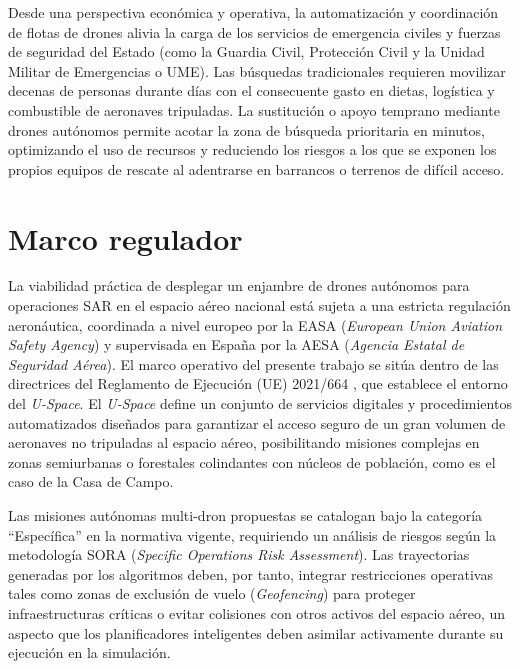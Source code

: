 Desde una perspectiva económica y operativa, la automatización y coordinación de flotas de drones alivia la carga de los servicios de emergencia civiles y fuerzas de seguridad del Estado (como la Guardia Civil, Protección Civil y la Unidad Militar de Emergencias o UME). Las búsquedas tradicionales requieren movilizar decenas de personas durante días con el consecuente gasto en dietas, logística y combustible de aeronaves tripuladas. La sustitución o apoyo temprano mediante drones autónomos permite acotar la zona de búsqueda prioritaria en minutos, optimizando el uso de recursos y reduciendo los riesgos a los que se exponen los propios equipos de rescate al adentrarse en barrancos o terrenos de difícil acceso.

\section{Marco regulador}
La viabilidad práctica de desplegar un enjambre de drones autónomos para operaciones SAR en el espacio aéreo nacional está sujeta a una estricta regulación aeronáutica, coordinada a nivel europeo por la EASA (\textit{European Union Aviation Safety Agency}) y supervisada en España por la AESA (\textit{Agencia Estatal de Seguridad Aérea}). El marco operativo del presente trabajo se sitúa dentro de las directrices del Reglamento de Ejecución (UE) 2021/664 \cite{eu2021uspace}, que establece el entorno del \textit{U-Space}. El \textit{U-Space} define un conjunto de servicios digitales y procedimientos automatizados diseñados para garantizar el acceso seguro de un gran volumen de aeronaves no tripuladas al espacio aéreo, posibilitando misiones complejas en zonas semiurbanas o forestales colindantes con núcleos de población, como es el caso de la Casa de Campo.

Las misiones autónomas multi-dron propuestas se catalogan bajo la categoría ``Específica'' en la normativa vigente, requiriendo un análisis de riesgos según la metodología SORA (\textit{Specific Operations Risk Assessment}). Las trayectorias generadas por los algoritmos deben, por tanto, integrar restricciones operativas tales como zonas de exclusión de vuelo (\textit{Geofencing}) para proteger infraestructuras críticas o evitar colisiones con otros activos del espacio aéreo, un aspecto que los planificadores inteligentes deben asimilar activamente durante su ejecución en la simulación.

